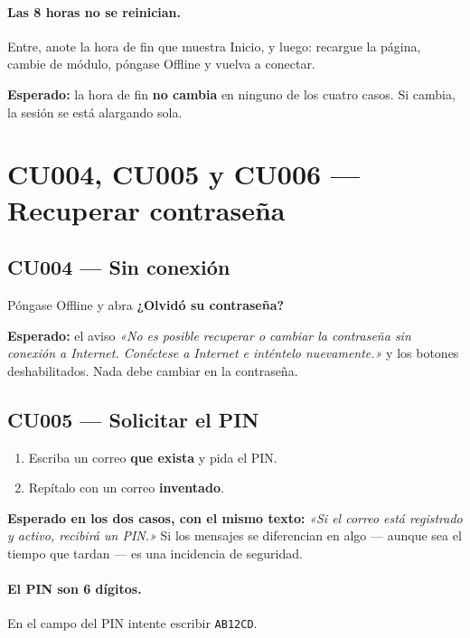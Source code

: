 \documentclass[11pt,a4paper]{article}
\begin{document}
\paragraph{Las 8 horas no se reinician.} Entre, anote la hora de fin que muestra
Inicio, y luego: recargue la página, cambie de módulo, póngase Offline y vuelva
a conectar.

\textbf{Esperado:} la hora de fin \textbf{no cambia} en ninguno de los cuatro
casos. Si cambia, la sesión se está alargando sola.

\newpage
\section{CU004, CU005 y CU006 --- Recuperar contraseña}

\subsection{CU004 --- Sin conexión}

Póngase Offline y abra \textbf{¿Olvidó su contraseña?}

\textbf{Esperado:} el aviso \emph{«No es posible recuperar o cambiar la
contraseña sin conexión a Internet. Conéctese a Internet e inténtelo
nuevamente.»} y los botones deshabilitados. Nada debe cambiar en la contraseña.

\subsection{CU005 --- Solicitar el PIN}

\begin{enumerate}
  \item Escriba un correo \textbf{que exista} y pida el PIN.
  \item Repítalo con un correo \textbf{inventado}.
\end{enumerate}

\textbf{Esperado en los dos casos, con el mismo texto:} \emph{«Si el correo está
registrado y activo, recibirá un PIN.»} Si los mensajes se diferencian en algo
--- aunque sea el tiempo que tardan --- es una incidencia de seguridad.

\paragraph{El PIN son 6 dígitos.} En el campo del PIN intente escribir
\texttt{AB12CD}.
\end{document}
